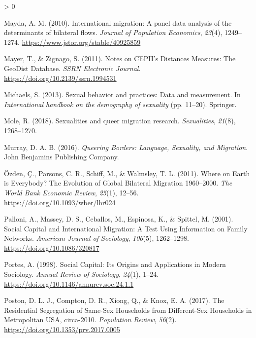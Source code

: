 \documentclass[
  11pt,
]{article}
\newlength{\cslhangindent}
\newenvironment{CSLReferences}[2] %
 {%
  \setlength{\parindent}{0pt}
  \ifodd #1 \everypar{\setlength{\hangindent}{\cslhangindent}}\ignorespaces\fi
  \ifnum #2 > 0
  \setlength{\parskip}{#2\baselineskip}
  \fi
 }%
 {}
\begin{document}
\begin{CSLReferences}{1}{0}
\leavevmode\hypertarget{ref-mayda_2010}{}%
Mayda, A. M. (2010). International migration: A panel data analysis of the determinants of bilateral flows. \emph{Journal of Population Economics}, \emph{23}(4), 1249--1274. \url{https://www.jstor.org/stable/40925859}

\leavevmode\hypertarget{ref-mayer_2011}{}%
Mayer, T., \& Zignago, S. (2011). Notes on {CEPII}'s {Distances} {Measures}: {The} {GeoDist} {Database}. \emph{SSRN Electronic Journal}. \url{https://doi.org/10.2139/ssrn.1994531}

\leavevmode\hypertarget{ref-michaels_2013}{}%
Michaels, S. (2013). Sexual behavior and practices: {Data} and measurement. In \emph{International handbook on the demography of sexuality} (pp. 11--20). Springer.

\leavevmode\hypertarget{ref-mole_2018a}{}%
Mole, R. (2018). Sexualities and queer migration research. \emph{Sexualities}, \emph{21}(8), 1268--1270.

\leavevmode\hypertarget{ref-murray_2016}{}%
Murray, D. A. B. (2016). \emph{Queering {Borders}: {Language}, {Sexuality}, and {Migration}}. John Benjamins Publishing Company.

\leavevmode\hypertarget{ref-ozden_2011}{}%
Özden, Ç., Parsons, C. R., Schiff, M., \& Walmsley, T. L. (2011). Where on {Earth} is {Everybody}? {The} {Evolution} of {Global} {Bilateral} {Migration} 1960--2000. \emph{The World Bank Economic Review}, \emph{25}(1), 12--56. \url{https://doi.org/10.1093/wber/lhr024}

\leavevmode\hypertarget{ref-palloni_2001}{}%
Palloni, A., Massey, D. S., Ceballos, M., Espinosa, K., \& Spittel, M. (2001). Social {Capital} and {International} {Migration}: {A} {Test} {Using} {Information} on {Family} {Networks}. \emph{American Journal of Sociology}, \emph{106}(5), 1262--1298. \url{https://doi.org/10.1086/320817}

\leavevmode\hypertarget{ref-portes_1998}{}%
Portes, A. (1998). Social {Capital}: {Its} {Origins} and {Applications} in {Modern} {Sociology}. \emph{Annual Review of Sociology}, \emph{24}(1), 1--24. \url{https://doi.org/10.1146/annurev.soc.24.1.1}

\leavevmode\hypertarget{ref-poston_2017}{}%
Poston, D. L. J., Compton, D. R., Xiong, Q., \& Knox, E. A. (2017). The {Residential} {Segregation} of {Same}-{Sex} {Households} from {Different}-{Sex} {Households} in {Metropolitan} {USA}, circa-2010. \emph{Population Review}, \emph{56}(2). \url{https://doi.org/10.1353/prv.2017.0005}


\end{CSLReferences}
\end{document}
